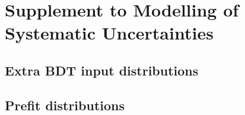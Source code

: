\chapter{Supplement to Modelling of Systematic Uncertainties}
\label{app:syst-summary}

\section{Extra BDT input distributions}
\label{app:bdt-inputs}

\section{Prefit distributions}
\label{app:full-prefit}





